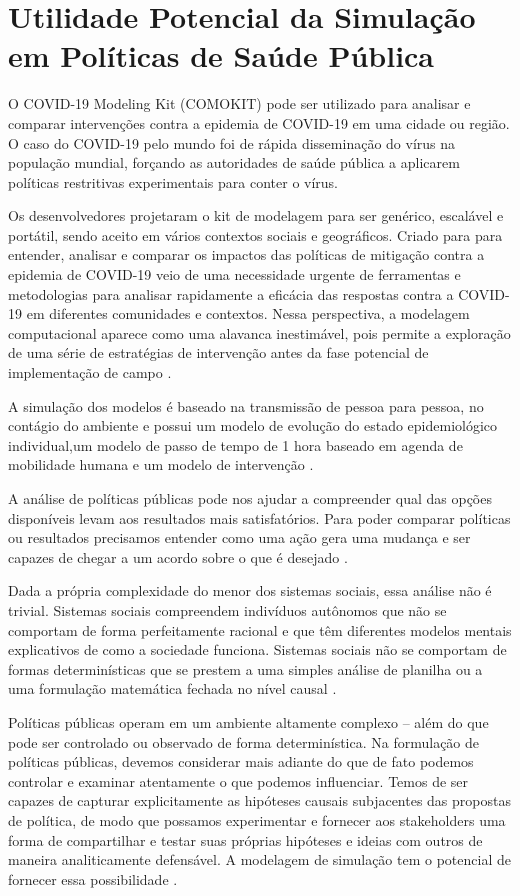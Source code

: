\section{Utilidade Potencial da Simulação em Políticas de Saúde Pública}

O COVID-19 Modeling Kit (COMOKIT) pode ser utilizado para analisar e comparar intervenções contra a epidemia de COVID-19 em uma cidade ou região. O caso do COVID-19 pelo mundo foi de rápida disseminação do vírus na população mundial, forçando as autoridades de saúde pública a aplicarem políticas restritivas experimentais para conter o vírus.

Os desenvolvedores projetaram o kit de modelagem para ser genérico, escalável e portátil, sendo aceito em vários contextos sociais e geográficos. Criado para para entender, analisar e comparar os impactos das políticas de mitigação contra a epidemia de COVID-19 veio de uma necessidade urgente de ferramentas e metodologias para analisar rapidamente a eficácia das respostas contra a COVID-19 em diferentes comunidades e contextos. Nessa perspectiva, a modelagem computacional aparece como uma alavanca inestimável, pois permite a exploração de uma série de estratégias de intervenção antes da fase potencial de implementação de campo \cite{ArtigoComokit:online}. 

A simulação dos modelos é baseado na transmissão de pessoa para pessoa, no contágio do ambiente e possui um modelo de evolução do estado epidemiológico individual,um modelo de passo de tempo de 1 hora baseado em agenda de mobilidade humana e um modelo de intervenção \cite{ArtigoComokit:online}.

A análise de políticas públicas pode nos ajudar a compreender qual das opções disponíveis levam aos resultados mais satisfatórios. Para poder comparar políticas ou resultados precisamos entender como uma ação gera uma mudança e ser capazes de chegar a um acordo sobre o que é desejado \cite{gentile2015modelos}.

Dada a própria complexidade do menor dos sistemas sociais, essa análise não é trivial. Sistemas sociais compreendem indivíduos autônomos que não se comportam de forma perfeitamente racional e que têm diferentes modelos mentais explicativos de como a sociedade funciona. Sistemas sociais não se comportam de formas determinísticas que se prestem a uma simples análise de planilha ou a uma formulação 
 matemática fechada no nível causal \cite{gentile2015modelos}.

Políticas públicas operam em um ambiente altamente complexo – além do que pode ser controlado ou observado de forma determinística. Na formulação de políticas públicas, devemos considerar mais adiante do que de fato podemos controlar e examinar atentamente o que podemos influenciar. Temos de ser capazes de capturar explicitamente as hipóteses causais subjacentes das propostas de política, de modo que possamos experimentar e fornecer aos stakeholders uma forma de compartilhar e testar suas próprias hipóteses e ideias com outros de 
maneira analiticamente defensável. A modelagem de simulação tem o potencial de fornecer essa possibilidade \cite{gentile2015modelos}.

